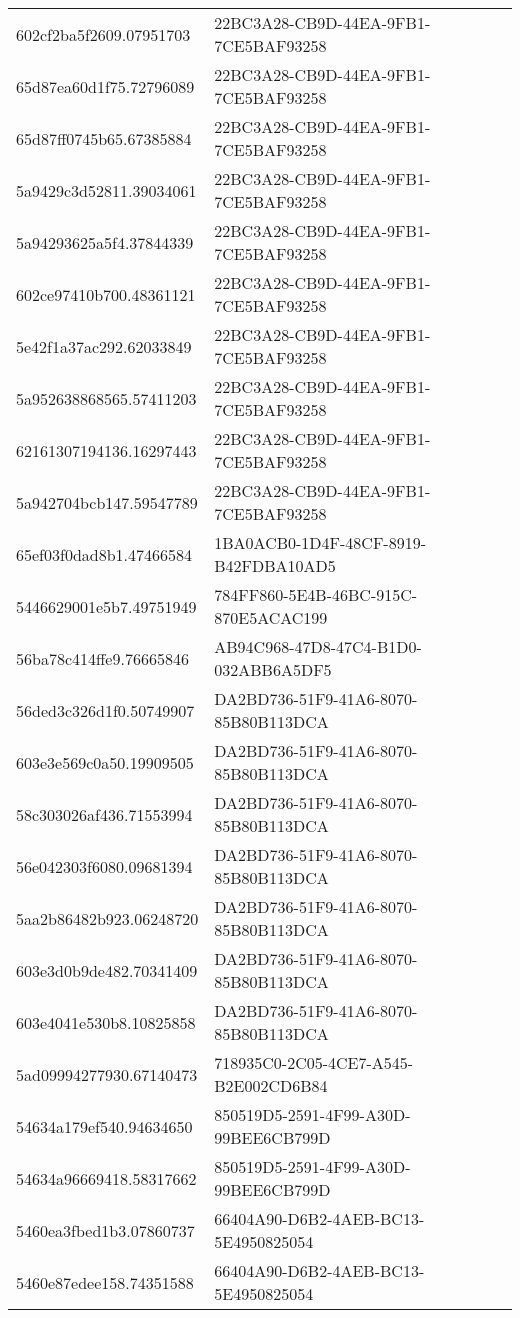 \begin{tabular}{ll}
602cf2ba5f2609.07951703 & 22BC3A28-CB9D-44EA-9FB1-7CE5BAF93258 \\
65d87ea60d1f75.72796089 & 22BC3A28-CB9D-44EA-9FB1-7CE5BAF93258 \\
65d87ff0745b65.67385884 & 22BC3A28-CB9D-44EA-9FB1-7CE5BAF93258 \\
5a9429c3d52811.39034061 & 22BC3A28-CB9D-44EA-9FB1-7CE5BAF93258 \\
5a94293625a5f4.37844339 & 22BC3A28-CB9D-44EA-9FB1-7CE5BAF93258 \\
602ce97410b700.48361121 & 22BC3A28-CB9D-44EA-9FB1-7CE5BAF93258 \\
5e42f1a37ac292.62033849 & 22BC3A28-CB9D-44EA-9FB1-7CE5BAF93258 \\
5a952638868565.57411203 & 22BC3A28-CB9D-44EA-9FB1-7CE5BAF93258 \\
62161307194136.16297443 & 22BC3A28-CB9D-44EA-9FB1-7CE5BAF93258 \\
5a942704bcb147.59547789 & 22BC3A28-CB9D-44EA-9FB1-7CE5BAF93258 \\
65ef03f0dad8b1.47466584 & 1BA0ACB0-1D4F-48CF-8919-B42FDBA10AD5 \\
5446629001e5b7.49751949 & 784FF860-5E4B-46BC-915C-870E5ACAC199 \\
56ba78c414ffe9.76665846 & AB94C968-47D8-47C4-B1D0-032ABB6A5DF5 \\
56ded3c326d1f0.50749907 & DA2BD736-51F9-41A6-8070-85B80B113DCA \\
603e3e569c0a50.19909505 & DA2BD736-51F9-41A6-8070-85B80B113DCA \\
58c303026af436.71553994 & DA2BD736-51F9-41A6-8070-85B80B113DCA \\
56e042303f6080.09681394 & DA2BD736-51F9-41A6-8070-85B80B113DCA \\
5aa2b86482b923.06248720 & DA2BD736-51F9-41A6-8070-85B80B113DCA \\
603e3d0b9de482.70341409 & DA2BD736-51F9-41A6-8070-85B80B113DCA \\
603e4041e530b8.10825858 & DA2BD736-51F9-41A6-8070-85B80B113DCA \\
5ad09994277930.67140473 & 718935C0-2C05-4CE7-A545-B2E002CD6B84 \\
54634a179ef540.94634650 & 850519D5-2591-4F99-A30D-99BEE6CB799D \\
54634a96669418.58317662 & 850519D5-2591-4F99-A30D-99BEE6CB799D \\
5460ea3fbed1b3.07860737 & 66404A90-D6B2-4AEB-BC13-5E4950825054 \\
5460e87edee158.74351588 & 66404A90-D6B2-4AEB-BC13-5E4950825054 \\

\end{tabular}

